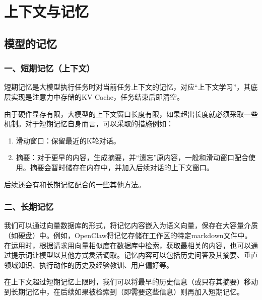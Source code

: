 \hypertarget{ux4e0aux4e0bux6587ux4e0eux8bb0ux5fc6}{%
\chapter{上下文与记忆}\label{ux4e0aux4e0bux6587ux4e0eux8bb0ux5fc6}}

\hypertarget{ux6a21ux578bux7684ux8bb0ux5fc6}{%
\section{模型的记忆}\label{ux6a21ux578bux7684ux8bb0ux5fc6}}

\hypertarget{ux4e00ux77edux671fux8bb0ux5fc6ux4e0aux4e0bux6587}{%
\subsection{一、短期记忆（上下文）}\label{ux4e00ux77edux671fux8bb0ux5fc6ux4e0aux4e0bux6587}}

短期记忆是大模型执行任务时对当前任务上下文的记忆，对应``上下文学习''，其底层实现是注意力中存储的KV Cache，任务结束后即清空。

由于硬件显存有限，大模型的上下文窗口长度有限，如果超出长度就必须采取一些机制。对于短期记忆自身而言，可以采取的措施例如：

\begin{enumerate}
\def\labelenumi{\arabic{enumi}.}
\item
  滑动窗口：保留最近的K轮对话。
\item
  摘要：对于更早的内容，生成摘要，并``遗忘''原内容，一般和滑动窗口配合使用。摘要会暂时储存在内存中，并加入后续对话的上下文窗口。
\end{enumerate}

后续还会有和长期记忆配合的一些其他方法。

\hypertarget{ux4e8cux957fux671fux8bb0ux5fc6}{%
\subsection{二、长期记忆}\label{ux4e8cux957fux671fux8bb0ux5fc6}}

我们可以通过向量数据库的形式，将记忆内容嵌入为语义向量，保存在大容量介质（如硬盘）中。例如，OpenClaw将记忆存储在工作区的特定markdown文件中。在运用时，根据请求用向量相似度在数据库中检索，获取最相关的内容，也可以通过提示词让模型以其他方式灵活调取。记忆内容可以包括历史问答及其摘要、垂直领域知识、执行动作的历史及经验教训、用户偏好等。

在上下文超过短期记忆上限时，我们可以将最早的历史信息（或只存其摘要）移动到长期记忆中，在后续如果被检索到（即需要这些信息）则再加入短期记忆。

